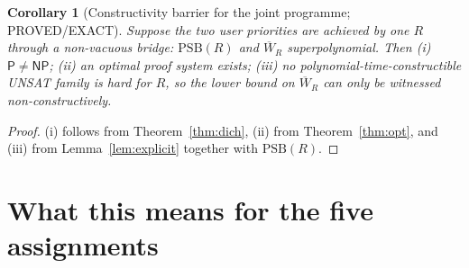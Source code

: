 \documentclass[11pt]{article}
\newtheorem{corollary}[theorem]{Corollary}
\theoremstyle{definition}
\newcommand{\Wbar}{\overline{W}}
\newcommand{\Pc}{\mathsf{P}}
\newcommand{\NP}{\mathsf{NP}}
\newcommand{\PSB}{\mathrm{PSB}}
\begin{document}
\begin{corollary}[Constructivity barrier for the joint programme; PROVED/EXACT]\label{cor:constr}
Suppose the two user priorities are achieved by one $R$ through a non-vacuous
bridge: $\PSB(R)$ and $\Wbar_R$ superpolynomial. Then
(i) $\Pc\ne\NP$;
(ii) an optimal proof system exists;
(iii) no polynomial-time-constructible UNSAT family is hard for $R$, so the
lower bound on $\Wbar_R$ can only be witnessed non-constructively.
\end{corollary}
\begin{proof}
(i) follows from Theorem~\ref{thm:dich}, (ii) from Theorem~\ref{thm:opt}, and
(iii) from Lemma~\ref{lem:explicit} together with $\PSB(R)$.
\end{proof}

\section{What this means for the five assignments}
\end{document}

